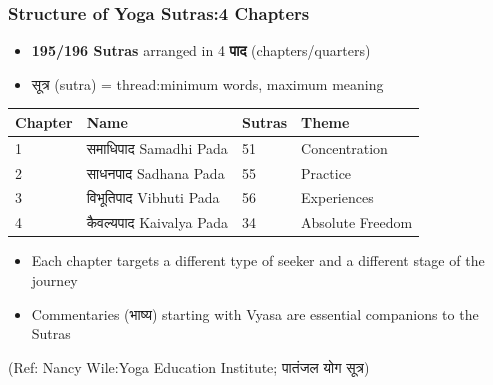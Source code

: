\begin{frame}[fragile]\frametitle{Structure of Yoga Sutras:4 Chapters}

\begin{itemize}
\item \textbf{195/196 Sutras} arranged in 4 \textbf{पाद} (chapters/quarters)
\item सूत्र (sutra) = thread:minimum words, maximum meaning
\end{itemize}

\begin{center}
\begin{tabular}{|p{0.8cm}|p{3cm}|p{0.8cm}|p{2.4cm}|}
\hline
\textbf{Chapter} & \textbf{Name} & \textbf{Sutras} & \textbf{Theme} \\
\hline
1 & समाधिपाद Samadhi Pada & 51 & Concentration \\
2 & साधनपाद Sadhana Pada & 55 & Practice \\
3 & विभूतिपाद Vibhuti Pada & 56 & Experiences \\
4 & कैवल्यपाद Kaivalya Pada & 34 & Absolute Freedom \\
\hline
\end{tabular}
\end{center}

\begin{itemize}
\item Each chapter targets a different type of seeker and a different stage of the journey
\item Commentaries (भाष्य) starting with Vyasa are essential companions to the Sutras
\end{itemize}

\tiny{(Ref: Nancy Wile:Yoga Education Institute; पातंजल योग सूत्र)}

\end{frame}

